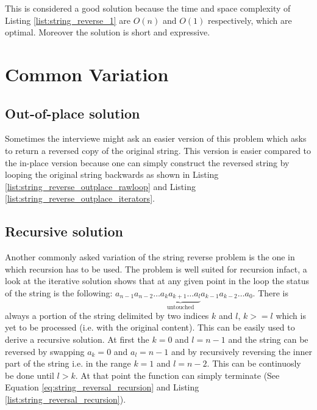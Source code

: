 This is considered a good solution because the time and space complexity of Listing \ref{list:string_reverse_1} are $O(n)$ and $O(1)$ respectively, which are optimal. Moreover the solution is short and expressive. 

\section{Common Variation}
\label{string_reverse:sec:variations}

\subsection{Out-of-place solution}
Sometimes the interviewe might ask an easier version of this problem which asks to return a reversed copy of the  original string. This version is easier compared to the in-place version because one can simply construct the reversed string by looping the original string backwards as shown in Listing \ref{list:string_reverse_outplace_rawloop} and Listing \ref{list:string_reverse_outplace_iterators}.





\subsection{Recursive solution}
Another commonly asked variation of the string reverse problem is the one in which recursion has to be used. The problem is well suited for recursion infact, a look at the iterative solution shows that at any given point in the loop the status of the string is the following: $a_{n-1}a_{n-2} \ldots \underbrace{a_k a_{k+1} \ldots a_l}_\text{untouched} a_{k-1}a_{k-2} \ldots a_0$. There is always a portion of the string delimited by two indices $k$ and $l$, $k>=l$ which is yet to be processed (i.e. with the original content). This can be easily used to derive a recursive solution. At first the $k=0$ and $l=n-1$ and the string can be reversed by swapping $a_k=0$ and $a_l=n-1$ and by recursively reversing the inner part of the string i.e. in the range $k=1$ and $l=n-2$. This can be continuosly be done until $l > k$. At that point the function can simply terminate (See Equation \ref{eq:string_reversal_recursion} and Listing \ref{list:string_reversal_recursion}).

